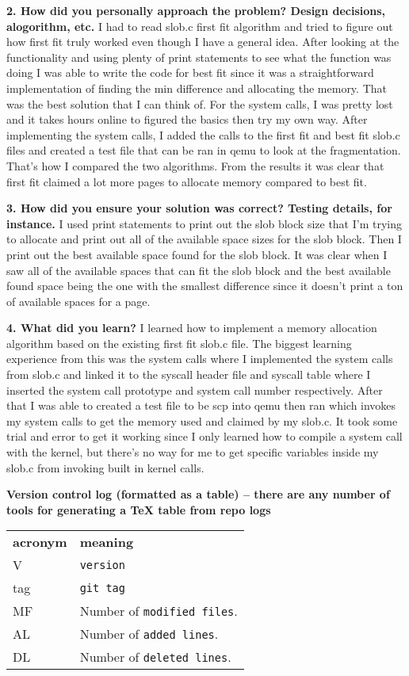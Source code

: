 \documentclass[letterpaper,10pt,titlepage,fleqn]{article}
\begin{document}
    \textbf{2. How did you personally approach the problem? Design decisions, alogorithm, etc.}
	I had to read slob.c first fit algorithm and tried to figure out how first fit truly worked even though I have a general idea. After looking at the functionality and using plenty of print statements to see what the function was doing I was able to write the code for best fit since it was a straightforward implementation of finding the min difference and allocating the memory. That was the best solution that I can think of. For the system calls, I was pretty lost and it takes hours online to figured the basics then try my own way. After implementing the system calls, I added the calls to the first fit and best fit slob.c files and created a test file that can be ran in qemu to look at the fragmentation. That's how I compared the two algorithms. From the results it was clear that first fit claimed a lot more pages to allocate memory compared to best fit.

    \textbf{3. How did you ensure your solution was correct? Testing details, for instance.}
    I used print statements to print out the slob block size that I'm trying to allocate and print out all of the available space sizes for the slob block. Then I print out the best available space found for the slob block. It was clear when I saw all of the available spaces that can fit the slob block and the best available found space being the one with the smallest difference since it doesn't print a ton of available spaces for a page.

    \textbf{4. What did you learn?}
	I learned how to implement a memory allocation algorithm based on the existing first fit slob.c file. The biggest learning experience from this was the system calls where I implemented the system calls from slob.c and linked it to the syscall header file and syscall table where I inserted the system call prototype and system call number respectively. After that I was able to created a test file to be scp into qemu then ran which invokes my system calls to get the memory used and claimed by my slob.c. It took some trial and error to get it working since I only learned how to compile a system call with the kernel, but there's no way for me to get specific variables inside my slob.c from invoking built in kernel calls.

\textbf{Version control log (formatted as a table) -- there are any number of tools for generating a TeX table from repo logs}
\begin{tabular}{lp{12cm}}
  \label{tabular:legend:git-log}
  \textbf{acronym} & \textbf{meaning} \\
  V & \texttt{version} \\
  tag & \texttt{git tag} \\
  MF & Number of \texttt{modified files}. \\
  AL & Number of \texttt{added lines}. \\
  DL & Number of \texttt{deleted lines}. \\
\end{tabular}
\end{document}
